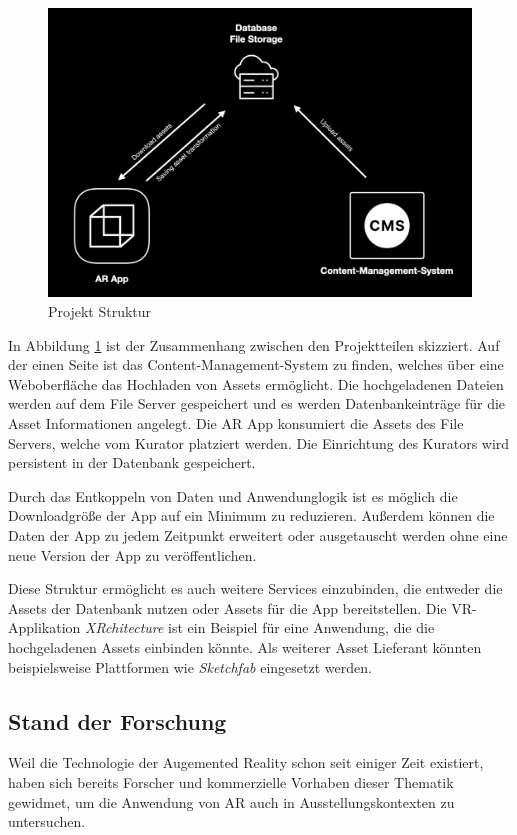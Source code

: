 \documentclass[titlepage, a4paper, 11pt]{scrartcl}
\begin{document}
  \begin{figure}[h]
    \centering
    \includegraphics[width=.6\textwidth]{project-structure}
    \caption{Projekt Struktur}
    \label{ProjektStruktur}
  \end{figure}

  In Abbildung \ref{ProjektStruktur} ist der Zusammenhang zwischen den Projektteilen skizziert.
  Auf der einen Seite ist das Content-Management-System zu finden, welches über eine Weboberfläche das Hochladen von Assets ermöglicht.
  Die hochgeladenen Dateien werden auf dem File Server gespeichert und es werden Datenbankeinträge für die Asset Informationen angelegt.
  Die AR App konsumiert die Assets des File Servers, welche vom Kurator platziert werden. Die Einrichtung des Kurators wird persistent in der Datenbank gespeichert. 
  
  Durch das Entkoppeln von Daten und Anwendunglogik ist es möglich die Downloadgröße der App auf ein Minimum zu reduzieren.
  Außerdem können die Daten der App zu jedem Zeitpunkt erweitert oder ausgetauscht werden ohne eine neue Version der App zu veröffentlichen. 

  Diese Struktur ermöglicht es auch weitere Services einzubinden, die entweder die Assets der Datenbank nutzen oder Assets für die App bereitstellen.
  Die VR-Applikation \textit{XRchitecture} ist ein Beispiel für eine Anwendung, die die hochgeladenen Assets einbinden könnte.
  Als weiterer Asset Lieferant könnten beispielsweise Plattformen wie \textit{Sketchfab} eingesetzt werden. 

    \subsection{Stand der Forschung}

      Weil die Technologie der Augemented Reality schon seit einiger Zeit existiert, haben sich bereits Forscher und kommerzielle Vorhaben dieser Thematik gewidmet,
      um die Anwendung von AR auch in Ausstellungskontexten zu untersuchen.
\end{document}
